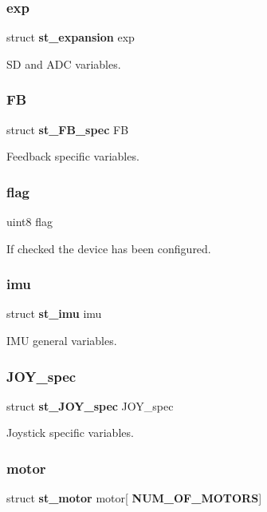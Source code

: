 \subsubsection{exp}
{\footnotesize\ttfamily struct \textbf{ st\+\_\+expansion} exp}

SD and A\+DC variables. \mbox{\label{structst__eeprom_a8917eae058a1a8c4d46b82e467cd0888}} 
\subsubsection{FB}
{\footnotesize\ttfamily struct \textbf{ st\+\_\+\+F\+B\+\_\+spec} FB}

Feedback specific variables. \mbox{\label{structst__eeprom_af11e40d15a1361229a78e772af5b3c94}} 
\subsubsection{flag}
{\footnotesize\ttfamily uint8 flag}

If checked the device has been configured. \mbox{\label{structst__eeprom_a5587b913fbf50df4c3a5148dd8aab649}} 
\subsubsection{imu}
{\footnotesize\ttfamily struct \textbf{ st\+\_\+imu} imu}

I\+MU general variables. \mbox{\label{structst__eeprom_a5fccafc99afd40ab4591e83b75ff9baa}} 
\subsubsection{J\+O\+Y\+\_\+spec}
{\footnotesize\ttfamily struct \textbf{ st\+\_\+\+J\+O\+Y\+\_\+spec} J\+O\+Y\+\_\+spec}

Joystick specific variables. \mbox{\label{structst__eeprom_abe01764856595b55e98fe187ae4c9b54}} 
\subsubsection{motor}
{\footnotesize\ttfamily struct \textbf{ st\+\_\+motor} motor[\textbf{ N\+U\+M\+\_\+\+O\+F\+\_\+\+M\+O\+T\+O\+RS}]}

